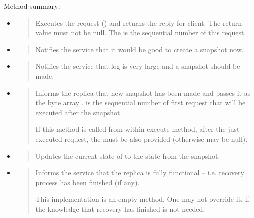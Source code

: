 Method summary:
\begin{itemize}
\item {} 
\begin{quote}

Executes the request () and returns the reply for client. The return value must not be null. The  is the sequential number of this request.
\end{quote}

\item {} 
\begin{quote}

Notifies the service that it would be good to create a snapshot now.
\end{quote}

\item {} 
\begin{quote}

Notifies the service that log is very large and a snapshot should be made.
\end{quote}

\item {} 
\begin{quote}

Informs the replica that new snapshot has been made and passes it as the byte array .  is the sequential number of first request that will be executed after the snapshot.

If this method is called from within execute method, after the just executed request, the  must be also provided (otherwise may be null).
\end{quote}

\item {} 
\begin{quote}

Updates the current state of  to the state from the snapshot.
\end{quote}

\item {} 
\begin{quote}

Informs the service that the replica is fully functional -- i.e. recovery process has been finished (if any).

This implementation is an empty method. One may not override it, if the knowledge that recovery has finished is not needed.
\end{quote}

\end{itemize}


